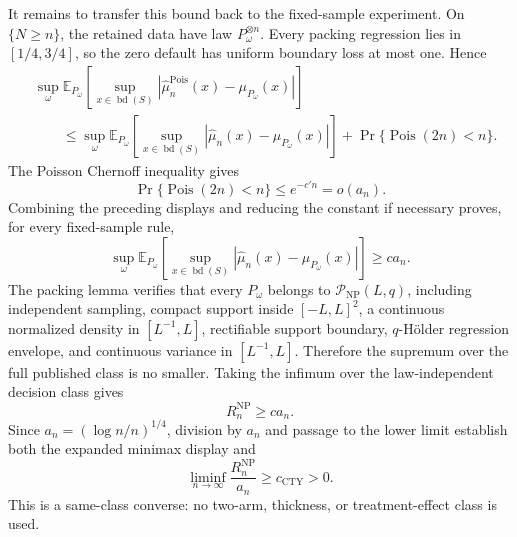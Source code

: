 It remains to transfer this bound back to the fixed-sample experiment.  On \(\{N\geq n\}\), the retained data have law \(P_\omega^{\otimes n}\).  Every packing regression lies in \([1/4,3/4]\), so the zero default has uniform boundary loss at most one.  Hence
\[
\begin{aligned}
 &\sup_\omega
 \mathbb E_{P_\omega}\!\left[
 \sup_{x\in\operatorname{bd}(S)}
 |\widehat\mu_n^{\mathrm{Pois}}(x)-\mu_{P_\omega}(x)|
 \right]\\
 &\qquad\leq
 \sup_\omega
 \mathbb E_{P_\omega}\!\left[
 \sup_{x\in\operatorname{bd}(S)}
 |\widehat\mu_n(x)-\mu_{P_\omega}(x)|
 \right]
 +\Pr\{\operatorname{Pois}(2n)<n\}.
\end{aligned}
\]
The Poisson Chernoff inequality gives
\[
 \Pr\{\operatorname{Pois}(2n)<n\}\leq e^{-c'n}=o(a_n).
\]
Combining the preceding displays and reducing the constant if necessary proves, for every fixed-sample rule,
\[
 \sup_\omega
 \mathbb E_{P_\omega}\!\left[
 \sup_{x\in\operatorname{bd}(S)}
 |\widehat\mu_n(x)-\mu_{P_\omega}(x)|
 \right]
 \geq c a_n.
\]
The packing lemma verifies that every \(P_\omega\) belongs to \(\mathcal P_{\mathrm{NP}}(L,q)\), including independent sampling, compact support inside \([-L,L]^2\), a continuous normalized density in \([L^{-1},L]\), rectifiable support boundary, \(q\)-H\"older regression envelope, and continuous variance in \([L^{-1},L]\).  Therefore the supremum over the full published class is no smaller.  Taking the infimum over the law-independent decision class gives
\[
 R_n^{\mathrm{NP}}\geq c a_n.
\]
Since \(a_n=(\log n/n)^{1/4}\), division by \(a_n\) and passage to the lower limit establish both the expanded minimax display and
\[
 \liminf_{n\to\infty}\frac{R_n^{\mathrm{NP}}}{a_n}\geq c_{\mathrm{CTY}}>0.
\]
This is a same-class converse: no two-arm, thickness, or treatment-effect class is used.